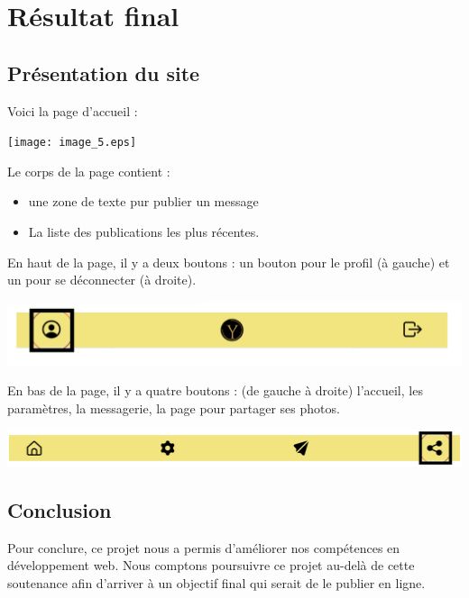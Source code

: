 \documentclass[12pt,a4paper]{article}
\begin{document}
\section{Résultat final}
\subsection{Présentation du site}

\graphicspath{ {./} }

Voici la page d'accueil :
\begin{center}
  \texttt{[image: image\_5.eps]}
\end{center}
Le corps de la page contient :
\begin{itemize}      

    \item une zone de texte pur publier un message
    \item La liste des publications les plus récentes.
      
\end{itemize}

\newpage

En haut de la page, il y a deux boutons : un bouton pour le profil (à gauche) et un pour se déconnecter (à droite).
\begin{center}
  \includegraphics[scale=0.3]{image_1.eps}
\end{center}

En bas de la page, il y a quatre boutons : (de gauche à droite) l'accueil, les paramètres, la messagerie, la page pour partager ses photos.
\begin{center}
  \includegraphics[scale=0.2]{image_3.eps}
\end{center}

\subsection{Conclusion}

Pour conclure, ce projet nous a permis d'améliorer nos compétences en développement web.
Nous comptons poursuivre ce projet au-delà de cette soutenance afin d'arriver à un objectif final qui serait de le publier en ligne.
\end{document}
